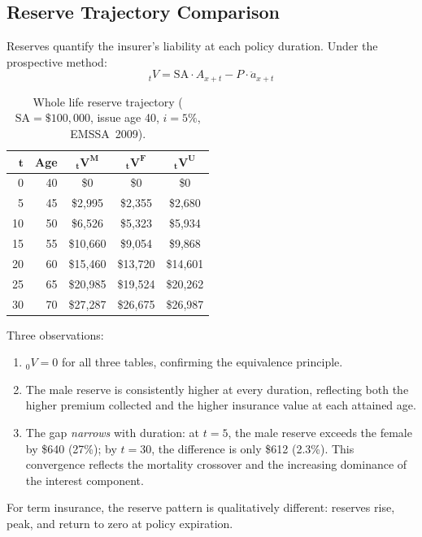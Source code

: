 \documentclass[12pt,a4paper]{article}
\newcommand{\Ax}[1]{A_{#1}}
\newcommand{\ax}[1]{\ddot{a}_{#1}}
\newcommand{\SA}{\text{SA}}
\begin{document}
\subsection{Reserve Trajectory Comparison}
\label{subsec:reserves}

Reserves quantify the insurer's liability at each policy duration. Under the
prospective method:
\begin{equation}
  {}_tV = \SA \cdot \Ax{x+t} - P \cdot \ax{x+t}
\end{equation}

\begin{table}[H]
\centering
\caption{Whole life reserve trajectory ($\SA = \$100{,}000$, issue age 40,
$i = 5\%$, EMSSA~2009).}
\label{tab:reserves-wl}
\begin{tabular}{rrccc}
\toprule
$\bm{t}$ & \textbf{Age} & $\bm{{}_tV^M}$ & $\bm{{}_tV^F}$ & $\bm{{}_tV^U}$ \\
\midrule
 0 & 40 & \$0 & \$0 & \$0 \\
 5 & 45 & \$2,995 & \$2,355 & \$2,680 \\
10 & 50 & \$6,526 & \$5,323 & \$5,934 \\
15 & 55 & \$10,660 & \$9,054 & \$9,868 \\
20 & 60 & \$15,460 & \$13,720 & \$14,601 \\
25 & 65 & \$20,985 & \$19,524 & \$20,262 \\
30 & 70 & \$27,287 & \$26,675 & \$26,987 \\
\bottomrule
\end{tabular}
\end{table}

Three observations:
\begin{enumerate}
  \item ${}_0V = 0$ for all three tables, confirming the equivalence principle.
  \item The male reserve is consistently higher at every duration, reflecting both
        the higher premium collected and the higher insurance value at each attained age.
  \item The gap \emph{narrows} with duration: at $t = 5$, the male reserve
        exceeds the female by \$640 (27\%); by $t = 30$, the difference is
        only \$612 (2.3\%). This convergence reflects the mortality crossover
        and the increasing dominance of the interest component.
\end{enumerate}

For term insurance, the reserve pattern is qualitatively different: reserves
rise, peak, and return to zero at policy expiration.
\end{document}
